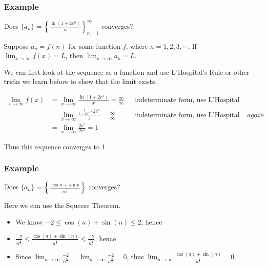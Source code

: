 \documentclass[t]{beamer}
\theoremstyle{plain}
\theoremstyle{definition}
\newcommand{\limm}[1]{\displaystyle \lim_{x\to #1}}
\begin{document}
\begin{frame}

\frametitle{Example}

\footnotesize

Does $\{a_n\} = \left\{ \frac{\ln(1 + 2e^n)}{n} \right\}_{n=1}^{\infty}$ converges? \pause

\medskip

Suppose $a_n = f(n)$ for some function $f$, where $n = 1, 2, 3, \cdots$.  If $\limm{\infty} f(x) = L$, then $\displaystyle\lim_{n \to \infty}  a_n = L$.

\medskip

We can first look at the sequence as a function and use L'Hospital's Rule or other tricks we learn before to show that the limit exists.

\begin{align*}
\limm{\infty} f(x) &= \limm{\infty} \frac{\ln(1 + 2e^x)}{x} = \frac{\infty}{\infty} && \text{indeterminate form, use L'Hospital Rule}\\
&= \limm{\infty} \frac{\frac{1}{1 + 2e^x} \cdot 2e^x}{1} = \frac{\infty}{\infty} && \text{indeterminate form, use L'Hospital Rule} again\\
&=  \limm{\infty} \frac{2e^x}{2e^x} = 1
\end{align*}

Thus this sequence converges to 1.

\end{frame}

\begin{frame}

\frametitle{Example}

Does $\{ a_n  \} = \left\{  \frac{\cos{n} + \sin{n}}{n^{\frac{2}{3}}}\right\}$ converges? \pause

\medskip

Here we can use the Squeeze Theorem.

\begin{itemize}
	\item We know $-2 \leq \cos(n) + \sin(n) \leq 2$, hence
	\item $\frac{-2}{n^{\frac{2}{3}}} \leq \frac{\cos(n) + \sin(n)}{n^{\frac{2}{3}}} \leq \frac{-2}{n^{\frac{2}{3}}}$, hence
	\item Since $\displaystyle\lim_{n \to \infty}  \frac{-2}{n^{\frac{2}{3}}}  =\displaystyle\lim_{n \to \infty}    \frac{-2}{n^{\frac{2}{3}}}  = 0$, thus $\displaystyle\lim_{n \to \infty}  \frac{\cos(n) + \sin(n)}{n^{\frac{2}{3}}} = 0$
\end{itemize}

\end{frame}
\end{document}
